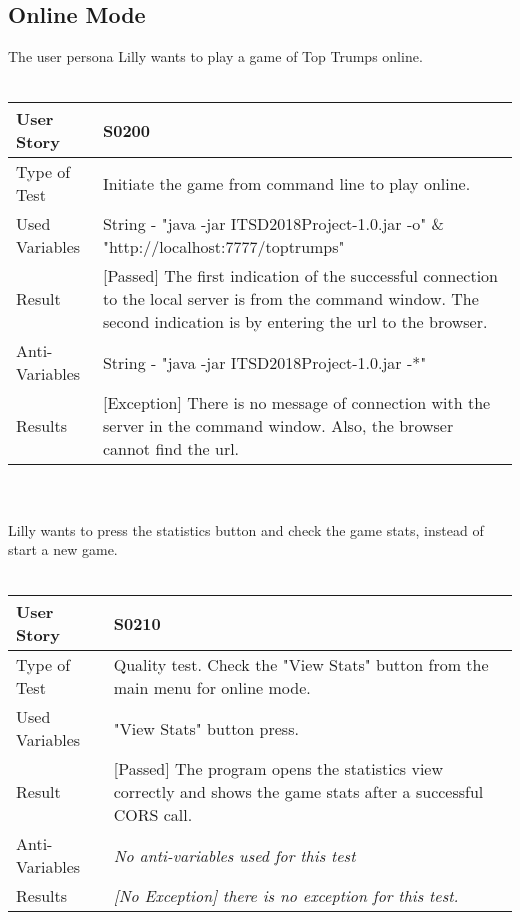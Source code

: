 \subsection{Online Mode}
\vspace{0.2cm} 
The user persona Lilly wants to play a game of Top Trumps online.\\
\vspace{0.2cm}\\  
\begin{tabular}{l | p{12cm}}
User Story & \textbf{S0200}\\ \hline
Type of Test & Initiate the game from command line to play online.\\ \hline
Used Variables & String - "java -jar ITSD2018Project-1.0.jar -o" \& "http://localhost:7777/toptrumps"\\ \hline
Result & [Passed] The first indication of the successful connection to the local server is from the command window. The second indication is by entering the url to the browser.\\ \hline
Anti-Variables & String - "java -jar ITSD2018Project-1.0.jar -*"\\ \hline
Results & [Exception] There is no message of connection with the server in the command window. Also, the browser cannot find the url.\\ \hline
\end{tabular}\\
\vspace{0.2cm}\\
Lilly wants to press the statistics button and check the game stats, instead of start a new game.\\
\vspace{0.2cm}\\  
\begin{tabular}{l | p{12cm}}
User Story & \textbf{S0210}\\ \hline
Type of Test & Quality test. Check the "View Stats" button from the main menu for online mode.\\ \hline
Used Variables & "View Stats" button press.\\ \hline
Result & [Passed] The program opens the statistics view correctly and shows the game stats after a successful CORS call.\\ \hline
Anti-Variables & \textit{No anti-variables used for this test}\\ \hline
Results & \textit{[No Exception] there is no exception for this test.}\\ \hline
\end{tabular}\\
